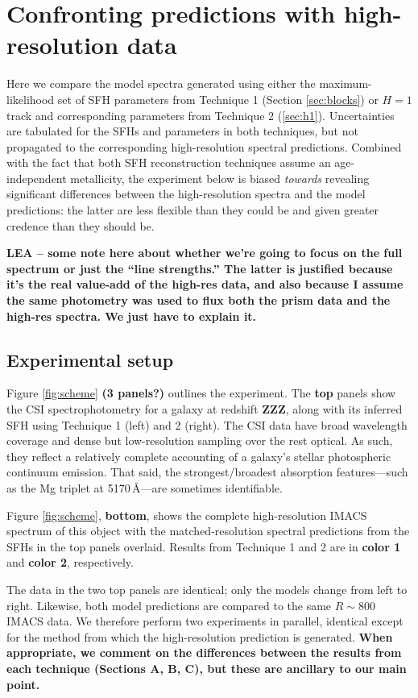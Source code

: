 \documentclass[a4paper,fleqn,usenatbib]{mnras}
\newcommand{\resp}{respectively}
\newcommand{\bfr}{\bf\color{red}}
\begin{document}
\section{Confronting predictions with high-resolution data}
\label{sec:results}

Here we compare the model spectra generated using either the maximum-likelihood set of SFH 
parameters from Technique 1 (Section \ref{sec:blocks}) or $H=1$ track and corresponding 
parameters from Technique 2 (\ref{sec:h1}). Uncertainties are tabulated for the SFHs and parameters 
in both techniques, but not propagated to the corresponding high-resolution spectral predictions. 
Combined with the fact that both SFH reconstruction techniques assume an age-independent 
metallicity, the experiment below is biased {\it towards} revealing significant differences between 
the high-resolution spectra and the model predictions: the latter are less flexible than they could 
be and given greater credence than they should be.

{\bfr LEA -- some note here about whether we're going to focus on the full spectrum or just the ``line
strengths.'' The latter is justified because it's the real value-add of the high-res data, and also because
I assume the same photometry was used to flux both the prism data and the high-res spectra. We
just have to explain it.}

\subsection{Experimental setup}

Figure \ref{fig:scheme} {\bfr (3 panels?)} outlines the experiment. The {\bfr top} panels show the
CSI spectrophotometry for a galaxy at redshift {\bfr ZZZ}, along with its inferred SFH using Technique 
1 (left) and 2 (right). The CSI data have broad wavelength 
coverage and dense but low-resolution sampling over the rest optical. As such, they reflect a relatively
complete accounting of a galaxy's stellar photospheric continuum emission. That said, 
the strongest/broadest absorption features---such as the Mg triplet at 5170\,\AA---are sometimes
identifiable.

Figure \ref{fig:scheme}, {\bfr bottom}, shows the complete high-resolution IMACS spectrum of 
this object with the matched-resolution spectral predictions from the SFHs in the top panels overlaid. 
Results from Technique 1 and 2 are in {\bfr color 1} and {\bfr color 2}, \resp. 

The data in the two top panels are identical; only the models change from left to right. Likewise,
both model predictions are compared to the same $R\sim800$ IMACS data. We therefore perform two 
experiments in parallel, identical except for the method from which the high-resolution prediction is 
generated. {\bfr When appropriate, we comment on the differences between the results from each
technique (Sections A, B, C), but these are ancillary to our main point.}
\end{document}
